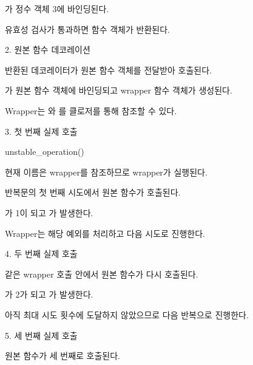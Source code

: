 가 정수 객체 3에 바인딩된다.

유효성 검사가 통과하면  함수 객체가 반환된다.

\begin{dhknote}
\begin{dhksmry}[centered]
2. 원본 함수 데코레이션
\end{dhksmry}
\end{dhknote}

반환된 데코레이터가 원본  함수 객체를 전달받아 호출된다.

가 원본 함수 객체에 바인딩되고 wrapper 함수 객체가 생성된다.

Wrapper는 와 를 클로저를 통해 참조할 수 있다.

\begin{dhknote}
\begin{dhksmry}[centered]
3. 첫 번째 실제 호출
\end{dhksmry}
\end{dhknote}

\begin{dhkcode}
unstable_operation()
\end{dhkcode}

현재 이름은 wrapper를 참조하므로 wrapper가 실행된다.

반복문의 첫 번째 시도에서 원본 함수가 호출된다.

가 1이 되고 가 발생한다.

Wrapper는 해당 예외를 처리하고 다음 시도로 진행한다.

\begin{dhknote}
\begin{dhksmry}[centered]
4. 두 번째 실제 호출
\end{dhksmry}
\end{dhknote}

같은 wrapper 호출 안에서 원본 함수가 다시 호출된다.

가 2가 되고 가 발생한다.

아직 최대 시도 횟수에 도달하지 않았으므로 다음 반복으로 진행한다.

\begin{dhknote}
\begin{dhksmry}[centered]
5. 세 번째 실제 호출
\end{dhksmry}
\end{dhknote}

원본 함수가 세 번째로 호출된다.

